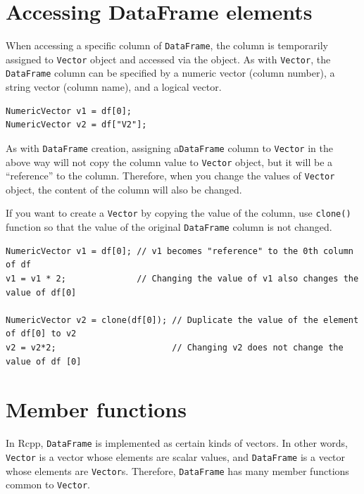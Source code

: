 \documentclass[
]{book}
\begin{document}
\hypertarget{accessing-dataframe-elements}{%
\section{Accessing DataFrame elements}\label{accessing-dataframe-elements}}

When accessing a specific column of \texttt{DataFrame}, the column is temporarily assigned to \texttt{Vector} object and accessed via the object. As with \texttt{Vector}, the \texttt{DataFrame} column can be specified by a numeric vector (column number), a string vector (column name), and a logical vector.

\begin{verbatim}
NumericVector v1 = df[0];
NumericVector v2 = df["V2"];
\end{verbatim}

As with \texttt{DataFrame} creation, assigning a\texttt{DataFrame} column to \texttt{Vector} in the above way will not copy the column value to \texttt{Vector} object, but it will be a ``reference'' to the column. Therefore, when you change the values of \texttt{Vector} object, the content of the column will also be changed.

If you want to create a \texttt{Vector} by copying the value of the column, use \texttt{clone()} function so that the value of the original \texttt{DataFrame} column is not changed.

\begin{verbatim}
NumericVector v1 = df[0]; // v1 becomes "reference" to the 0th column of df
v1 = v1 * 2;              // Changing the value of v1 also changes the value of df[0]

NumericVector v2 = clone(df[0]); // Duplicate the value of the element of df[0] to v2
v2 = v2*2;                       // Changing v2 does not change the value of df [0]
\end{verbatim}

\hypertarget{member-functions}{%
\section{Member functions}\label{member-functions}}

In Rcpp, \texttt{DataFrame} is implemented as certain kinds of vectors. In other words, \texttt{Vector} is a vector whose elements are scalar values, and \texttt{DataFrame} is a vector whose elements are \texttt{Vector}s. Therefore, \texttt{DataFrame} has many member functions common to \texttt{Vector}.
\end{document}
